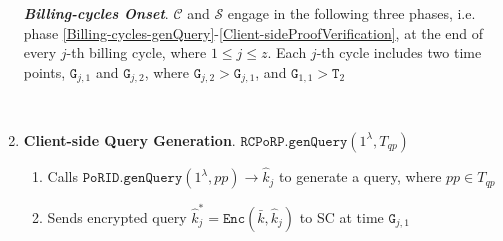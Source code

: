 \begin{enumerate}
\textbf{\textit{Billing-cycles Onset}}. $\mathcal{C}$ and $\mathcal{S}$ engage in the following three phases, i.e. phase \ref{Billing-cycles-genQuery}-\ref{Client-sideProofVerification},  at the end of every $j$-th billing cycle, where $1\leq j\leq z$. Each $j$-th cycle includes two  time points, $\texttt{G}_{\scriptscriptstyle j,1}$ and $\texttt{G}_{\scriptscriptstyle j,2}$, where $\texttt{G}_{\scriptscriptstyle j,2}>\texttt{G}_{\scriptscriptstyle j,1}$, and $\texttt{G}_{\scriptscriptstyle 1,1}>\texttt{T}_{\scriptscriptstyle 2}$ 


\

\item\textbf{Client-side Query Generation}.\label{Billing-cycles-genQuery} $\mathtt{RCPoRP}.\mathtt{genQuery}(1^\lambda,  T_{\scriptscriptstyle qp})$

\begin{enumerate}

\item Calls $\mathtt{PoRID.genQuery}(1^{\lambda},  pp)\rightarrow \hat{k}_{\scriptscriptstyle j}$ to generate a query, where  $ pp\in T_{\scriptscriptstyle qp}$


\item Sends encrypted query  $\hat{k}^{\scriptscriptstyle *}_{\scriptscriptstyle j}=\mathtt{Enc}(\bar{k},\hat{k}_{\scriptscriptstyle j})$ to SC at time $\texttt{G}_{\scriptscriptstyle j,1}$



\end{enumerate}


\end{enumerate}
